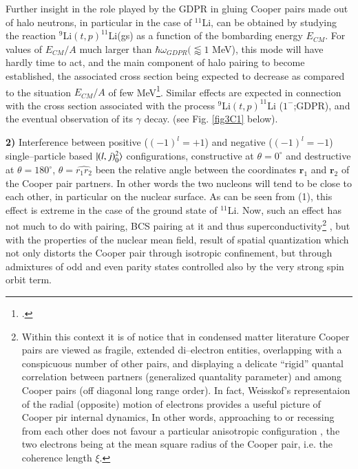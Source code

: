 \begin{subappendices}
    	Further insight in the role played by the GDPR in gluing Cooper pairs made out of halo neutrons, in particular in the case of $^{11}$Li, can be obtained by studying the reaction $^{9}$Li$(t,p)^{11}$Li(gs) as a function of the bombarding energy $E_{CM}$. For values of $E_{CM}/A$ much larger than $\hbar\omega_{GDPR} (\lessapprox 1$ MeV), this mode will have hardly time to act, and the main component of halo pairing to become established, the associated cross section being expected to decrease as compared to the situation $E_{CM}/A$ of few MeV\footnote{\cite{Tanihata:08}.}. Similar effects are expected in connection with the cross section associated with the process  $^{9}$Li$(t,p)^{11}$Li ($1^{-}$;GDPR), and the eventual observation of its $\gamma$ decay. (see Fig. \ref{fig3C1} below).
    	
    				
 \textbf{2)} Interference between positive ($(-1)^l=+1$) and negative ($(-1)^l=-1$) single--particle based $|{(l,j)^2_0} \rangle$ configurations, constructive at $\theta=0^\circ$ and destructive at $\theta=180^\circ$, $\theta=\hat{r_1r_2}$ been the relative angle between the coordinates $\mathbf r_1$ and $\mathbf r_2$ of the Cooper pair partners. In other words the two nucleons will tend to be close to each other, in particular on the nuclear surface. As can be seen from (1), this effect is extreme in the case of the ground state of $^{11}$Li. Now, such an effect has not much to do with pairing, BCS pairing at it and thus superconductivity\footnote{Within this context it is of notice that in condensed matter literature Cooper pairs are viewed as fragile, extended di--electron entities, overlapping with a conspicuous number of other pairs, and displaying a delicate ``rigid'' quantal correlation between partners (generalized quantality parameter) and among Cooper pairs (off diagonal long range order). In fact, Weisskof's representaion of the radial (opposite) motion of electrons provides a useful picture of Cooper pir internal dynamics, In other words, approaching to or recessing from each other does not favour a particular anisotropic configuration , the two electrons being at the mean square radius of the Cooper pair, i.e. the coherence length $\xi$.}		, but with the properties of the nuclear mean field, result of spatial quantization which not only distorts the Cooper pair through isotropic confinement, but through admixtures of odd and even parity states controlled also by the very strong spin orbit term.									


\end{subappendices}
